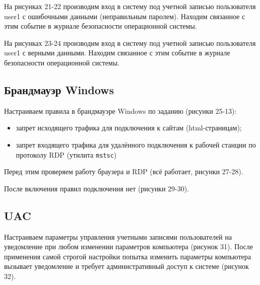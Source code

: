 На рисунках 21-22 производим вход в систему под учетной записью пользователя user1 с ошибочными данными (неправильным паролем). Находим связанное с этим событие в журнале безопасности операционной системы.
\FloatBarrier

На рисунках 23-24 производим вход в систему под учетной записью пользователя user1 с верными данными. Находим связанное с этим событие в журнале безопасности операционной системы.
\FloatBarrier

\subsection{Брандмауэр Windows}
Настраиваем правила в брандмауэре Windows по заданию (рисунки 25-13):
\begin{itemize}
    \item запрет исходящего трафика для подключения к сайтам (html-страницам);
    \item запрет входящего трафика для удалённого подключения к рабочей станции по протоколу RDP (утилита \texttt{mstsc})
\end{itemize}
\FloatBarrier

Перед этим проверяем работу браузера и RDP (всё работает, рисунки 27-28).
\FloatBarrier

После включения правил подключения нет (рисунки 29-30).
\FloatBarrier


\subsection{UAC}
Настраиваем параметры управления учетными записями пользователей на уведомление при любом изменении параметров компьютера (рисунок 31). После применения самой строгой настройки попытка изменить параметры компьютера вызывает уведомление и требует административный доступ к системе (рисунок 32).
\FloatBarrier


